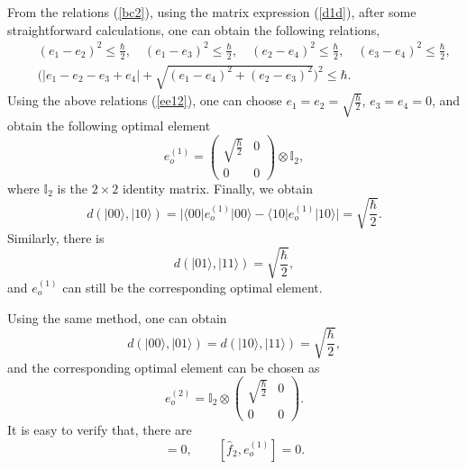 \documentclass[a4paper,12pt]{article}
\begin{document}
From the relations (\ref{bc2}), using the matrix expression (\ref{d1d}), after some straightforward calculations, one can obtain the following relations,
\begin{eqnarray}\label{ee12}
	&&(e_1-e_2)^2\leqslant \frac{\hbar}{2},\quad
	(e_1-e_3)^2\leqslant \frac{\hbar}{2},\quad
	(e_2-e_4)^2\leqslant \frac{\hbar}{2},\quad
	(e_3-e_4)^2\leqslant \frac{\hbar}{2},
	\nonumber\\
	&&\Big(|e_1-e_2-e_3+e_4|+\sqrt{(e_1-e_4)^2+(e_2-e_3)^2}\Big)^2\leqslant \hbar.
\end{eqnarray}
Using the above relations (\ref{ee12}), one can choose $e_1=e_2=\sqrt{\frac{\hbar}{2}}$, $e_3=e_4=0$, and obtain the following optimal element
\begin{equation}
	e_o^{(1)}
	=\left( \begin{array}{cc}
		\sqrt{\frac{\hbar}{2}} & 0 \\ 0 & 0 \end{array} \right)\otimes \mathds{I}_2,
\end{equation}
where $\mathds{I}_2$ is the $2\times 2$ identity matrix.
Finally, we obtain
\begin{equation}
	d(|00 \rangle,|10 \rangle)=|\langle 00|e_o^{(1)}|00\rangle-\langle 10|e_o^{(1)}|10\rangle|=\sqrt{\frac{\hbar}{2}}.
\end{equation}
Similarly, there is
\begin{equation}
	d(|01 \rangle,|11 \rangle)=\sqrt{\frac{\hbar}{2}},
\end{equation}
and $e_o^{(1)}$ can still be the corresponding optimal element.

Using the same method, one can obtain
\begin{equation}
	d(|00\rangle, |01\rangle)=
	d(|10\rangle, |11\rangle)=\sqrt{\frac{\hbar}{2}},
\end{equation}
and the corresponding optimal element can be chosen as
\begin{equation}
	e_o^{(2)}
	=\mathds{I}_2\otimes\left( \begin{array}{cc}
		\sqrt{\frac{\hbar}{2}} & 0 \\ 0 & 0 \end{array} \right).
\end{equation}
It is easy to verify that, there are
\begin{equation}
	[\hat{f}_1,e_o^{(2)}]=0,\qquad [\hat{f}_2,e_o^{(1)}]=0.
\end{equation}
\end{document}
